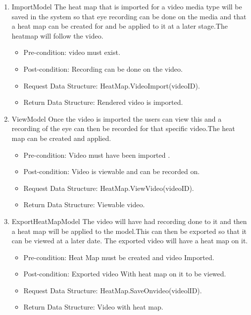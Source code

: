 		\begin{enumerate}
\item{ImportModel}
\newline
The heat map that is imported for a video media type will be saved in the system so that eye recording can be done on the media and that a heat map can be created for and be applied to it at a later stage.The heatmap will follow the video.
\begin{itemize}
\item Pre-condition: video must exist.
\item Post-condition: Recording can be done on the video.
\item Request Data Structure: HeatMap.VideoImport(videoID).
\item Return Data Structure: Rendered video is imported.
\end{itemize}

\item{ViewModel}
Once the video is imported the users can view this and a recording of the eye can then be recorded for that specific video.The heat map can be created and applied.
\begin{itemize}
\item Pre-condition: Video must have been imported .
\item Post-condition: Video is viewable and can be recorded on.
\item Request Data Structure: HeatMap.ViewVideo(videoID).
\item Return Data Structure: Viewable video.
\end{itemize}

\item{ExportHeatMapModel}
The video will have had recording done to it and then a heat map will be applied to the model.This can then be exported so that it can be viewed at a later date. The exported video will have a heat map on it.
\begin{itemize}
\item Pre-condition: Heat Map must be created and video Imported.
\item Post-condition: Exported video With heat map on it to be viewed.
\item Request Data Structure: HeatMap.SaveOnvideo(videolID).
\item Return Data Structure: Video with heat map.
\end{itemize}

\end{enumerate}
		
